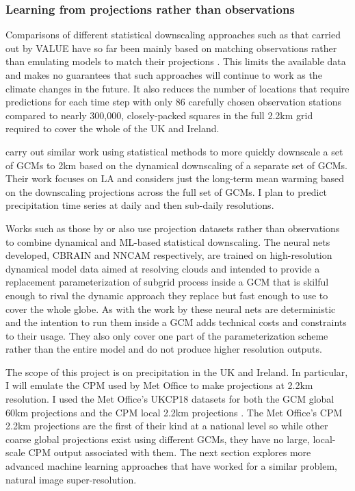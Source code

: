 \subsubsection{Learning from projections rather than observations}

Comparisons of different statistical downscaling approaches such as that carried out by VALUE have so far been mainly based on matching observations rather than emulating models to match their projections \cite{maraun2019sddownscaling}. This limits the available data and makes no guarantees that such approaches will continue to work as the climate changes in the future. It also reduces the number of locations that require predictions for each time step with only 86 carefully chosen observation stations compared to nearly 300,000, closely-packed squares in the full 2.2km grid required to cover the whole of the UK and Ireland.

\textcite{walton2015hybriddownscaling} carry out similar work using statistical methods to more quickly downscale a set of GCMs to 2km based on the dynamical downscaling of a separate set of GCMs. Their work focuses on LA and considers just the long-term mean warming based on the downscaling projections across the full set of GCMs. I plan to predict precipitation time series at daily and then sub-daily resolutions.

Works such as those by \textcite{gentine2018mlsuperparam} or \textcite{rasp2018dlsubgridclimmodel} also use projection datasets rather than observations to combine dynamical and ML-based statistical downscaling. The neural nets developed, CBRAIN \cite{gentine2018mlsuperparam} and NNCAM \cite{rasp2018dlsubgridclimmodel} respectively, are trained on high-resolution dynamical model data aimed at resolving clouds and intended to provide a replacement parameterization of subgrid process inside a GCM that is skilful enough to rival the dynamic approach they replace but fast enough to use to cover the whole globe. As with the work by \textcite{vandal2018mldownscaling} these neural nets are deterministic and the intention to run them inside a GCM adds technical costs and constraints to their usage. They also only cover one part of the parameterization scheme rather than the entire model and do not produce higher resolution outputs.

The scope of this project is on precipitation in the UK and Ireland. In particular, I will emulate the CPM used by Met Office to make projections at 2.2km resolution. I used the Met Office's UKCP18 datasets for both the GCM global 60km projections \cite{ukcp18global} and the CPM local 2.2km projections \cite{ukcp18local}. The Met Office's CPM 2.2km projections are the first of their kind at a national level \cite{kendon2019ukcpscience} so while other coarse global projections exist using different GCMs, they have no large, local-scale CPM output associated with them. The next section explores more advanced machine learning approaches that have worked for a similar problem, natural image super-resolution.
